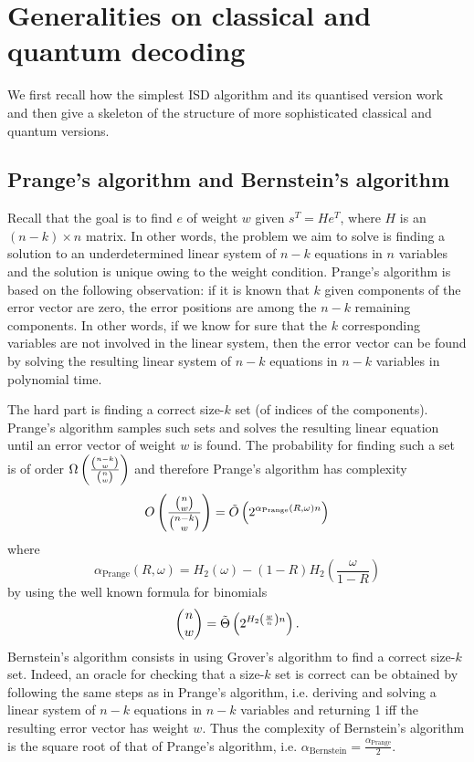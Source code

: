 \section{Generalities on classical and quantum decoding}
\label{sec:classical_quantum_decoding}
We first recall how the simplest ISD algorithm \cite{P62} and its quantised version \cite{B10} work and 
then give a skeleton of the structure of more sophisticated classical and quantum versions.
\subsection{Prange's algorithm and Bernstein's algorithm}
Recall that the goal is to find $e$ of weight $w$ given $s^T = He^T$, where $H$ is an $(n-k) \times n$ matrix. In other words, the problem we aim to solve is finding a solution to an underdetermined linear system of $n-k$ equations in $n$ variables and the  solution is unique owing to the weight condition. Prange's algorithm is based on the following observation: if it is known that $k$ given components of the error vector are zero, the error positions are among the $n-k$ remaining components. In other words, if we know for sure that the $k$ corresponding variables are not involved in the linear system, then the error vector can be found by solving the resulting linear system of $n-k$ equations in $n-k$ variables in polynomial time.

The hard part is finding a correct size-$k$ set (of indices of the components). Prange's algorithm 
samples such sets and solves the resulting linear equation until an error vector of weight $w$ is found.
The probability for finding such a set is of order 
$\Omega \left( \frac{\binom{n-k}{w}}{\binom{n}{w}} \right)$ and therefore
Prange's algorithm has  
complexity 
$$O\left(  \frac{\binom{n}{w}}{\binom{n-k}{w}} \right)=\tilde{O}\left( 2^{\alpha_{\text{Prange}}(R,\omega)n} \right)$$
where
$$\alpha_{\text{Prange}}(R,\omega) = H_2(\omega) - (1-R)H_2\left(\frac{\omega}{1-R}\right)$$
by using the well known formula for binomials
$$
\binom{n}{w} = \tilde{\Theta}\left( 2^{H_2\left( \frac{w}{n} \right)n} \right).
$$
Bernstein's algorithm consists in using Grover's algorithm to find a correct size-$k$ set. Indeed, an oracle for checking that a size-$k$ set is correct can be obtained by following the same steps as in Prange's algorithm, i.e. deriving and solving a linear system of $n-k$ equations in $n-k$ variables and returning 1 iff the resulting error vector has weight $w$.
Thus the complexity of Bernstein's algorithm is the square root of that of Prange's algorithm, i.e. $\alpha_{\text{Bernstein}} = \frac{\alpha_{\text{Prange}}}{2}$.

